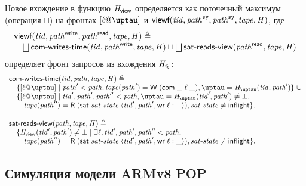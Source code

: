 Новое вхождение в функцию $\mathit{H}_{\mathsf{view}}$ определяется как поточечный максимум (операция $\sqcup$)
на фронтах $[\loc@\tau]$ и
$\textbf{\sf viewf}(\mathit{tid}, \mathit{path}^{\mathtt{sy}}, \mathit{path}^{\mathtt{sy}}, \mathit{tape}, \mathit{H})$, где
\[\begin{array}{l}
\textbf{\sf viewf}(\mathit{tid}, \mathit{path}^{\bf \sf write}, \mathit{path}^{\bf \sf read}, \mathit{tape}, \mathit{H}) \triangleq \\
\quad \bigsqcup \textsf{com-writes-time}(\mathit{tid}, \mathit{path}^{\bf \sf write}, \mathit{tape}, \mathit{H}) \sqcup \bigsqcup \textsf{sat-reads-view}(\mathit{path}^{\bf \sf read}, \mathit{tape}, \mathit{H})
\end{array}\]
определяет фронт запросов из вхождения $\mathit{H}_{\leqslant}$:
\[\begin{array}{l}
\opstau(\tId, \cpath, \tape, \hmap) \triangleq \\
\quad \{[\loc @ \tau] \mid
        \cpath' < \cpath, \tape(\cpath') = \tapeWrite{(\tapeWriteCommitted{\_}{\loc}{\_})},
        \tau = \tmap(\tId , \cpath')
        \} \; \cup \\
\quad \{[\loc @ \tau] \mid
        \tId', \cpath', \cpath'' < \cpath,  \tau = \tmap(\tId', \cpath') \not = \bot, \\
\quad \quad \tape(\cpath'') = \tapeRead{(\tapeSatisfied{\satisfiedState}{\stRequestWrite{\tId'}{ \cpath'}{\loc}{\_}})},
        \satisfiedState \not = \SatisfiedInFlight \}. \\
\\
\readsSatisfiedR(\cpath, \tape, \hmap) \triangleq \\
\quad \{\rmap(\tId', \cpath') \not = \bot \mid \exists \loc, \tId', \cpath', \cpath'' < \cpath,\\
\quad \quad \tape(\cpath'') = \tapeRead{(\tapeSatisfied{\satisfiedState}{\stRequestWrite{\tId'}{ \cpath'}{\loc}{\_}})},
        \satisfiedState \not = \SatisfiedInFlight \}. \\
\end{array}\]

\subsection{Симуляция модели ARMv8 POP}
\label{sec:armvpop:armt:sim}


